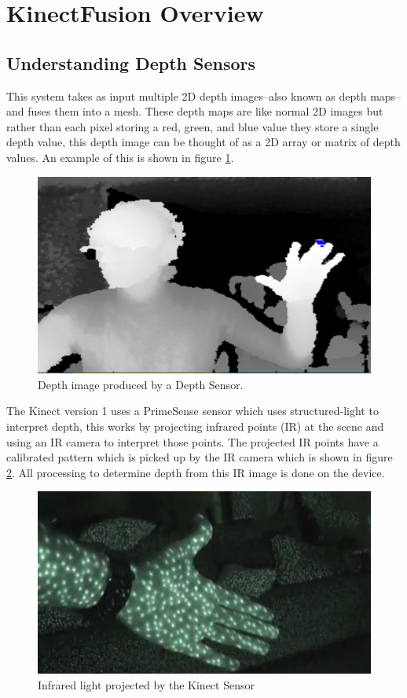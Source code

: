 \documentclass[10pt, twocolumn]{article}
\begin{document}
\section{KinectFusion Overview}

\subsection{Understanding Depth Sensors}
This system takes as input multiple 2D depth images--also known as depth maps--and fuses them into a mesh. These depth maps are like normal 2D images but rather than each pixel storing a red, green, and blue value they store a single depth value, this depth image can be thought of as a 2D array or matrix of depth values. An example of this is shown in figure \ref{fig:depthimage}. 

\begin{figure}[h!]
  \centering
  \includegraphics[width=0.8\linewidth]{depthimage}
  \caption{Depth image produced by a Depth Sensor.}
  \label{fig:depthimage}
\end{figure}

The Kinect version 1 uses a PrimeSense sensor which uses structured-light to interpret depth, this works by projecting infrared points (IR) at the scene and using an IR camera to interpret those points. The projected IR points have a calibrated pattern which is picked up by the IR camera which is shown in figure \ref{fig:ir}. All processing to determine depth from this IR image is done on the device. 

\begin{figure}[h!]
  \centering
  \includegraphics[width=0.8\linewidth]{KinectIR}
  \caption{Infrared light projected by the Kinect Sensor}
  \label{fig:ir}
\end{figure}
\end{document}
